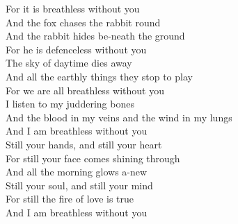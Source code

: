 For it is  breathless without  you\\
And the fox chases the  rabbit round\\
And the  rabbit hides be-neath the ground \\
For he is  defenceless without  you\\
The sky of daytime  dies away\\
And  all the earthly things  they stop to play \\
For we are  all breathless without  you\\
I listen to my  juddering bones\\
And the  blood in my veins and the  wind in my lungs \\
And I am  breathless without  you\\
Still your  hands, and still your  heart\\
For still your  face comes shining  through\\
And all the  morning glows a-new\\
Still your  soul, and still your  mind\\
For still the  fire of love is  true\\
And I am  breathless without  you 

